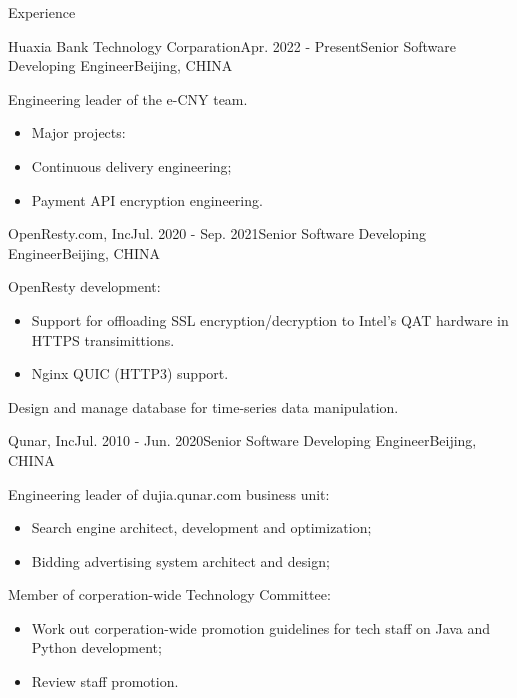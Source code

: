 \documentclass{resume} %
\begin{document}
\begin{rSection}{Experience}
  \begin{rSubsection}{Huaxia Bank Technology Corparation}{Apr. 2022 - Present}{Senior Software Developing Engineer}{Beijing, CHINA}
  \item Engineering leader of the e-CNY team.
    \begin {itemize}
    \item  Major projects:
    \item Continuous delivery engineering;
    \item Payment API encryption engineering.
    \end{itemize}
  \end{rSubsection}

  \begin{rSubsection}{OpenResty.com, Inc}{Jul. 2020 - Sep. 2021}{Senior Software Developing Engineer}{Beijing, CHINA}
  \item OpenResty development:
    \begin {itemize}
    \item Support for offloading SSL encryption/decryption to Intel's QAT hardware in HTTPS transimittions.
    \item Nginx QUIC (HTTP3) support.
    \end{itemize}
  \item Design and manage database for time-series data manipulation.
  \end{rSubsection}

  \begin{rSubsection}{Qunar, Inc}{Jul. 2010 - Jun. 2020}{Senior Software Developing Engineer}{Beijing, CHINA}
  \item Engineering leader of dujia.qunar.com business unit:
    \begin{itemize}
    \item Search engine architect, development and optimization;
    \item Bidding advertising system architect and design;
    \end{itemize}
  \item Member of corperation-wide Technology Committee:
    \begin{itemize}
    \item Work out corperation-wide promotion guidelines for tech staff on Java and Python development;
    \item Review staff promotion.
    \end{itemize}
  

\end{rSubsection}
\end{rSection}
\end{document}
